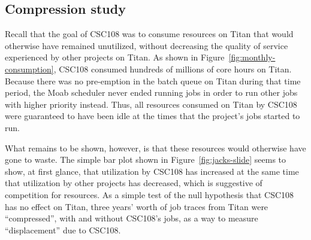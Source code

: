 \subsection{Compression study}
\label{subsec:compression-study}


Recall that the goal of CSC108 was to consume resources on Titan that would
otherwise have remained unutilized, without decreasing the quality of service
experienced by other projects on Titan.   As shown in Figure~\ref{fig:monthly-consumption},
CSC108 consumed hundreds of millions of core hours on Titan. Because there was
no pre-emption in the batch queue on Titan during that time period, the Moab
scheduler never ended running jobs in order to run other jobs with higher
priority instead. Thus, all resources consumed on Titan by CSC108 were
guaranteed to have been idle at the times that the project's jobs started to
run.

What remains to be shown, however, is that these resources would otherwise
have gone to waste. The simple bar plot shown in Figure~\ref{fig:jacks-slide}
seems to show, at first glance, that utilization by CSC108 has increased at
the same time that utilization by other projects has decreased, which is
suggestive of competition for resources. As a simple test of the null
hypothesis that CSC108 has no effect on Titan, three years' worth of job
traces from Titan were ``compressed'', with and without CSC108's jobs, as a
way to measure ``displacement'' due to CSC108.

 

